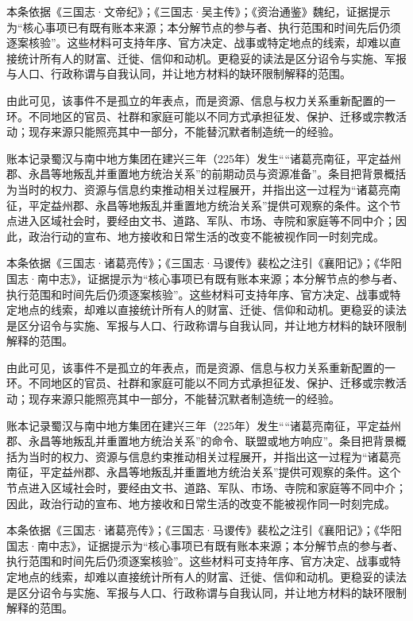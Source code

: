 本条依据《三国志·文帝纪》；《三国志·吴主传》；《资治通鉴》魏纪，证据提示为“核心事项已有既有账本来源；本分解节点的参与者、执行范围和时间先后仍须逐案核验”。这些材料可支持年序、官方决定、战事或特定地点的线索，却难以直接统计所有人的财富、迁徙、信仰和动机。更稳妥的读法是区分诏令与实施、军报与人口、行政称谓与自我认同，并让地方材料的缺环限制解释的范围。

由此可见，该事件不是孤立的年表点，而是资源、信息与权力关系重新配置的一环。不同地区的官员、社群和家庭可能以不同方式承担征发、保护、迁移或宗教活动；现存来源只能照亮其中一部分，不能替沉默者制造统一的经验。

账本记录蜀汉与南中地方集团在建兴三年（225年）发生““诸葛亮南征，平定益州郡、永昌等地叛乱并重置地方统治关系”的前期动员与资源准备”。条目把背景概括为当时的权力、资源与信息约束推动相关过程展开，并指出这一过程为“诸葛亮南征，平定益州郡、永昌等地叛乱并重置地方统治关系”提供可观察的条件。这个节点进入区域社会时，要经由文书、道路、军队、市场、寺院和家庭等不同中介；因此，政治行动的宣布、地方接收和日常生活的改变不能被视作同一时刻完成。

本条依据《三国志·诸葛亮传》；《三国志·马谡传》裴松之注引《襄阳记》；《华阳国志·南中志》，证据提示为“核心事项已有既有账本来源；本分解节点的参与者、执行范围和时间先后仍须逐案核验”。这些材料可支持年序、官方决定、战事或特定地点的线索，却难以直接统计所有人的财富、迁徙、信仰和动机。更稳妥的读法是区分诏令与实施、军报与人口、行政称谓与自我认同，并让地方材料的缺环限制解释的范围。

由此可见，该事件不是孤立的年表点，而是资源、信息与权力关系重新配置的一环。不同地区的官员、社群和家庭可能以不同方式承担征发、保护、迁移或宗教活动；现存来源只能照亮其中一部分，不能替沉默者制造统一的经验。

账本记录蜀汉与南中地方集团在建兴三年（225年）发生““诸葛亮南征，平定益州郡、永昌等地叛乱并重置地方统治关系”的命令、联盟或地方响应”。条目把背景概括为当时的权力、资源与信息约束推动相关过程展开，并指出这一过程为“诸葛亮南征，平定益州郡、永昌等地叛乱并重置地方统治关系”提供可观察的条件。这个节点进入区域社会时，要经由文书、道路、军队、市场、寺院和家庭等不同中介；因此，政治行动的宣布、地方接收和日常生活的改变不能被视作同一时刻完成。

本条依据《三国志·诸葛亮传》；《三国志·马谡传》裴松之注引《襄阳记》；《华阳国志·南中志》，证据提示为“核心事项已有既有账本来源；本分解节点的参与者、执行范围和时间先后仍须逐案核验”。这些材料可支持年序、官方决定、战事或特定地点的线索，却难以直接统计所有人的财富、迁徙、信仰和动机。更稳妥的读法是区分诏令与实施、军报与人口、行政称谓与自我认同，并让地方材料的缺环限制解释的范围。

